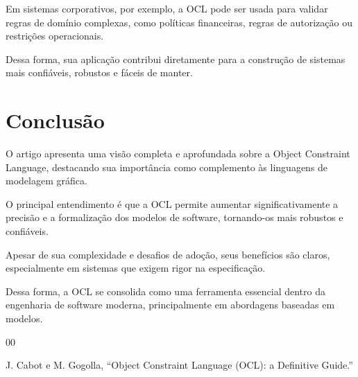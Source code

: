 \documentclass[conference]{IEEEtran}
\begin{document}
Em sistemas corporativos, por exemplo, a OCL pode ser usada para validar regras de domínio complexas, como políticas financeiras, regras de autorização ou restrições operacionais.

Dessa forma, sua aplicação contribui diretamente para a construção de sistemas mais confiáveis, robustos e fáceis de manter.

\section{Conclusão}

O artigo apresenta uma visão completa e aprofundada sobre a Object Constraint Language, destacando sua importância como complemento às linguagens de modelagem gráfica.

O principal entendimento é que a OCL permite aumentar significativamente a precisão e a formalização dos modelos de software, tornando-os mais robustos e confiáveis.

Apesar de sua complexidade e desafios de adoção, seus benefícios são claros, especialmente em sistemas que exigem rigor na especificação.

Dessa forma, a OCL se consolida como uma ferramenta essencial dentro da engenharia de software moderna, principalmente em abordagens baseadas em modelos.

\begin{thebibliography}{00}

J. Cabot e M. Gogolla,
``Object Constraint Language (OCL): a Definitive Guide.''

\end{thebibliography}
\end{document}
